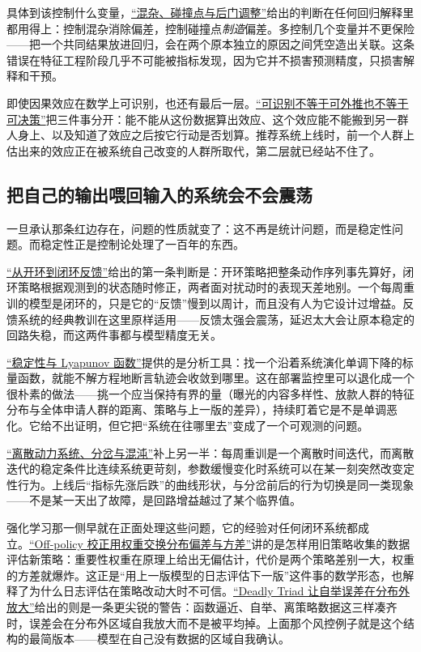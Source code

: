 具体到该控制什么变量，\hyperref[sec:13-Machine-Learning/12-Causal-Inference/03]{``混杂、碰撞点与后门调整''}给出的判断在任何回归解释里都用得上：控制混杂消除偏差，控制碰撞点\emph{制造}偏差。多控制几个变量并不更保险——把一个共同结果放进回归，会在两个原本独立的原因之间凭空造出关联。这条错误在特征工程阶段几乎不可能被指标发现，因为它并不损害预测精度，只损害解释和干预。

即使因果效应在数学上可识别，也还有最后一层。\hyperref[sec:13-Machine-Learning/12-Causal-Inference/06]{``可识别不等于可外推也不等于可决策''}把三件事分开：能不能从这份数据算出效应、这个效应能不能搬到另一群人身上、以及知道了效应之后按它行动是否划算。推荐系统上线时，前一个人群上估出来的效应正在被系统自己改变的人群所取代，第二层就已经站不住了。

\subsection{把自己的输出喂回输入的系统会不会震荡}

一旦承认那条红边存在，问题的性质就变了：这不再是统计问题，而是稳定性问题。而稳定性正是控制论处理了一百年的东西。

\hyperref[sec:16-Control-and-Reinforcement-Learning/01-Optimal-Control/01]{``从开环到闭环反馈''}给出的第一条判断是：开环策略把整条动作序列事先算好，闭环策略根据观测到的状态随时修正，两者面对扰动时的表现天差地别。一个每周重训的模型是闭环的，只是它的``反馈''慢到以周计，而且没有人为它设计过增益。反馈系统的经典教训在这里原样适用——反馈太强会震荡，延迟太大会让原本稳定的回路失稳，而这两件事都与模型精度无关。

\hyperref[sec:15-Differential-Equations-and-Dynamical-Systems/02-Stability-and-Dynamical-Systems/02]{``稳定性与 Lyapunov 函数''}提供的是分析工具：找一个沿着系统演化单调下降的标量函数，就能不解方程地断言轨迹会收敛到哪里。这在部署监控里可以退化成一个很朴素的做法——挑一个应当保持有界的量（曝光的内容多样性、放款人群的特征分布与全体申请人群的距离、策略与上一版的差异），持续盯着它是不是单调恶化。它给不出证明，但它把``系统在往哪里去''变成了一个可观测的问题。

\hyperref[sec:15-Differential-Equations-and-Dynamical-Systems/02-Stability-and-Dynamical-Systems/03]{``离散动力系统、分岔与混沌''}补上另一半：每周重训是一个离散时间迭代，而离散迭代的稳定条件比连续系统更苛刻，参数缓慢变化时系统可以在某一刻突然改变定性行为。上线后``指标先涨后跌''的曲线形状，与分岔前后的行为切换是同一类现象——不是某一天出了故障，是回路增益越过了某个临界值。

强化学习那一侧早就在正面处理这些问题，它的经验对任何闭环系统都成立。\hyperref[sec:16-Control-and-Reinforcement-Learning/02-Reinforcement-Learning/08]{``Off-policy 校正用权重交换分布偏差与方差''}讲的是怎样用旧策略收集的数据评估新策略：重要性权重在原理上给出无偏估计，代价是两个策略差别一大，权重的方差就爆炸。这正是``用上一版模型的日志评估下一版''这件事的数学形态，也解释了为什么日志评估在策略改动大时不可信。\hyperref[sec:16-Control-and-Reinforcement-Learning/02-Reinforcement-Learning/06]{``Deadly Triad 让自举误差在分布外放大''}给出的则是一条更尖锐的警告：函数逼近、自举、离策略数据这三样凑齐时，误差会在分布外区域自我放大而不是被平均掉。上面那个风控例子就是这个结构的最简版本——模型在自己没有数据的区域自我确认。

